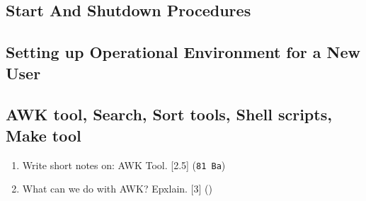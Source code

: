 \documentclass[12pt]{article}
\begin{document}
	\subsection{Start And Shutdown Procedures}
	\subsection{Setting up Operational Environment for a New User}
	\subsection{AWK tool, Search, Sort tools, Shell scripts, Make tool}
		\begin{enumerate}
			\item Write short notes on: AWK Tool. \hfill [2.5] (\texttt{81 Ba})

			\item What can we do with AWK? Epxlain. \hfill [3] ()
		\end{enumerate}
\end{document}
